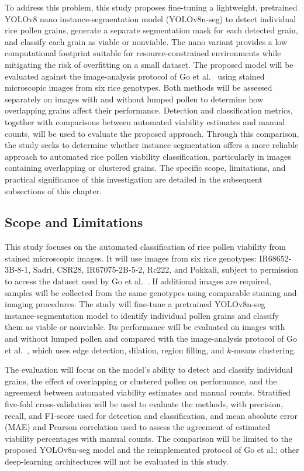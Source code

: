 To address this problem, this study proposes fine-tuning a lightweight, pretrained YOLOv8 nano instance-segmentation model (YOLOv8n-seg) to detect individual rice pollen grains, generate a separate segmentation mask for each detected grain, and classify each grain as viable or nonviable. The nano variant provides a low computational footprint suitable for resource-constrained environments while mitigating the risk of overfitting on a small dataset. The proposed model will be evaluated against the image-analysis protocol of Go et al.~\cite{go2019} using stained microscopic images from six rice genotypes. Both methods will be assessed separately on images with and without lumped pollen to determine how overlapping grains affect their performance. Detection and classification metrics, together with comparisons between automated viability estimates and manual counts, will be used to evaluate the proposed approach. Through this comparison, the study seeks to determine whether instance segmentation offers a more reliable approach to automated rice pollen viability classification, particularly in images containing overlapping or clustered grains. The specific scope, limitations, and practical significance of this investigation are detailed in the subsequent subsections of this chapter.

\subsection{Scope and Limitations}
\label{sec:scope-limitations}

This study focuses on the automated classification of rice pollen viability from stained microscopic images. It will use images from six rice genotypes: IR68652-3B-8-1, Sadri, CSR28, IR67075-2B-5-2, Rc222, and Pokkali, subject to permission to access the dataset used by Go et al.~\cite{go2019}. If additional images are required, samples will be collected from the same genotypes using comparable staining and imaging procedures. The study will fine-tune a pretrained YOLOv8n-seg instance-segmentation model to identify individual pollen grains and classify them as viable or nonviable. Its performance will be evaluated on images with and without lumped pollen and compared with the image-analysis protocol of Go et al.~\cite{go2019}, which uses edge detection, dilation, region filling, and $k$-means clustering.

The evaluation will focus on the model's ability to detect and classify individual grains, the effect of overlapping or clustered pollen on performance, and the agreement between automated viability estimates and manual counts. Stratified five-fold cross-validation will be used to evaluate the methods, with precision, recall, and F1-score used for detection and classification, and mean absolute error (MAE) and Pearson correlation used to assess the agreement of estimated viability percentages with manual counts. The comparison will be limited to the proposed YOLOv8n-seg model and the reimplemented protocol of Go et al.; other deep-learning architectures will not be evaluated in this study.

